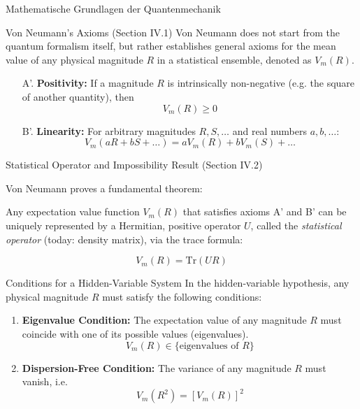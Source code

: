 \begin{frame}{Mathematische Grundlagen der Quantenmechanik}
\begin{minipage}{0.44\textwidth}
  \end{minipage}
\end{frame}

\begin{frame}{Von Neumann's Axioms (Section IV.1)}
  Von Neumann does not start from the quantum formalism itself, 
  but rather establishes general axioms for the mean value of any 
  physical magnitude $R$ in a statistical ensemble, denoted as $V_m(R)$.  

  \pause
  \begin{itemize}
    \item[A'.] \textbf{Positivity:}  
    If a magnitude $R$ is intrinsically non-negative (e.g. the square of another quantity), then  
    \[
    V_m(R) \geq 0
    \]

    \pause
    \item[B'.] \textbf{Linearity:}  
    For arbitrary magnitudes $R, S, \dots$ and real numbers $a, b, \dots$:  
    \[
    V_m(aR + bS + \dots) = aV_m(R) + bV_m(S) + \dots
    \]
  \end{itemize}
\end{frame}

\begin{frame}{Statistical Operator and Impossibility Result (Section IV.2)}
 
  Von Neumann proves a fundamental theorem:  

  \pause
  Any expectation value function $V_m(R)$ that satisfies axioms A' and B' 
  can be uniquely represented by a Hermitian, positive operator $U$, 
  called the \textit{statistical operator} (today: density matrix), via the trace formula:

  \pause
  \[
    V_m(R) = \mathrm{Tr}(UR)
  \]
\end{frame}

\begin{frame}{Conditions for a Hidden-Variable System}
  In the hidden-variable hypothesis, any physical magnitude $R$ 
  must satisfy the following conditions:

  \pause
  \begin{enumerate}
    \item \textbf{Eigenvalue Condition:}  
    The expectation value of any magnitude $R$ must coincide with one of its possible values (eigenvalues).  
    \[
      V_m(R) \in \{\text{eigenvalues of } R\}
    \]

    \pause
    \item \textbf{Dispersion-Free Condition:}  
    The variance of any magnitude $R$ must vanish, i.e.  
    \[
      V_m(R^2) = [V_m(R)]^2
    \]
  \end{enumerate}
\end{frame}

